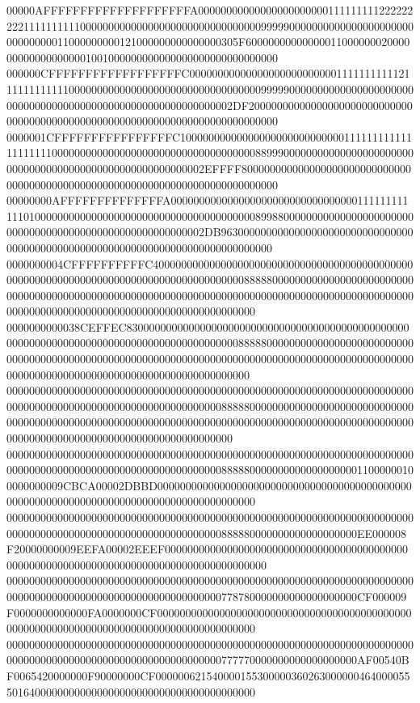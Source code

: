 00000AFFFFFFFFFFFFFFFFFFFFA0000000000000000000000011111111122222222211111111110000000000000000000000000000000099999000000000000000000000000000000011000000000121000000000000000305F60000000000000011000000020000000000000000001001000000000000000000000000000000
000000CFFFFFFFFFFFFFFFFFFC0000000000000000000000000011111111111211111111111100000000000000000000000000000000009999900000000000000000000000000000000000000000000000000000000000002DF20000000000000000000000000000000000000000000000000000000000000000000000000000
0000001CFFFFFFFFFFFFFFFFC1000000000000000000000000000011111111111111111111000000000000000000000000000000000000889990000000000000000000000000000000000000000000000000000000002EFFFF800000000000000000000000000000000000000000000000000000000000000000000000000000
00000000AFFFFFFFFFFFFFFA00000000000000000000000000000000011111111111101000000000000000000000000000000000000000899880000000000000000000000000000000000000000000000000000000002DB963000000000000000000000000000000000000000000000000000000000000000000000000000000
0000000004CFFFFFFFFFFC400000000000000000000000000000000000000000000000000000000000000000000000000000000000000088888000000000000000000000000000000000000000000000000000000000000000000000000000000000000000000000000000000000000000000000000000000000000000000000
0000000000038CEFFEC830000000000000000000000000000000000000000000000000000000000000000000000000000000000000000088888000000000000000000000000000000000000000000000000000000000000000000000000000000000000000000000000000000000000000000000000000000000000000000000
0000000000000000000000000000000000000000000000000000000000000000000000000000000000000000000000000000000000000088888000000000000000000000000000000000000000000000000000000000000000000000000000000000000000000000000000000000000000000000000000000000000000000000
0000000000000000000000000000000000000000000000000000000000000000000000000000000000000000000000000000000000000088888000000000000000000011000000100000000009CBCA00002DBBD00000000000000000000000000000000000000000000000000000000000000000000000000000000000000000
00000000000000000000000000000000000000000000000000000000000000000000000000000000000000000000000000000000000000888880000000000000000000EE000008F20000000009EEFA00002EEEF00000000000000000000000000000000000000000000000000000000000000000000000000000000000000000
00000000000000000000000000000000000000000000000000000000000000000000000000000000000000000000000000000000000000778780000000000000000000CF000009F0000000000000FA0000000CF00000000000000000000000000000000000000000000000000000000000000000000000000000000000000000
00000000000000000000000000000000000000000000000000000000000000000000000000000000000000000000000000000000000000777770000000000000000000AF00540BF0065420000000F90000000CF00000062154000015530000036026300000046400005550164000000000000000000000000000000000000000
